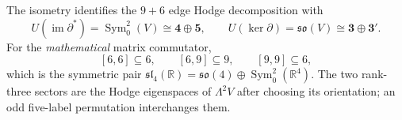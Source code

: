 \documentclass[11pt]{article}
\begin{document}
\begin{corollary}
\label{p1:cor:v339-petersen-matrix-symmetric-pair}
The isometry identifies the $9+6$ edge Hodge decomposition with
\[
 U(\operatorname{im}\partial^*)=\operatorname{Sym}^2_0(V)
 \cong\mathbf4\oplus\mathbf5,\qquad
 U(\ker\partial)=\mathfrak{so}(V)\cong\mathbf3\oplus\mathbf3'.
\]
For the \emph{mathematical} matrix commutator,
\[
 [6,6]\subseteq6,\qquad[6,9]\subseteq9,\qquad[9,9]\subseteq6,
\]
which is the symmetric pair
$\mathfrak{sl}_4(\mathbb R)=\mathfrak{so}(4)
\oplus\operatorname{Sym}^2_0(\mathbb R^4)$.
The two rank-three sectors are the Hodge eigenspaces of
$\Lambda^2V$ after choosing its orientation; an odd five-label
permutation interchanges them.
\end{corollary}
\end{document}
